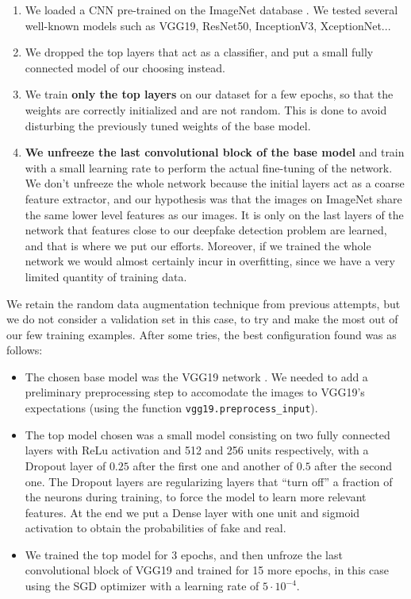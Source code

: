 \documentclass[11pt]{article}
\begin{document}
\begin{enumerate}
  \item We loaded a CNN pre-trained on the ImageNet database \citep{deng2009imagenet}.  We tested several well-known models such as VGG19, ResNet50, InceptionV3, XceptionNet...
  \item We dropped the top layers that act as a classifier, and put a small fully connected model of our choosing instead.
  \item We train \textbf{only the top layers} on our dataset for a few epochs, so that the weights are correctly initialized and are not random. This is done to avoid disturbing the previously tuned weights of the base model.
  \item \textbf{We unfreeze the last convolutional block of the base model} and train with a small learning rate to perform the actual fine-tuning of the network. We don't unfreeze the whole network because the initial layers act as a coarse feature extractor, and our hypothesis was that the images on ImageNet share the same lower level features as our images. It is only on the last layers of the network that features close to our deepfake detection problem are learned, and that is where we put our efforts. Moreover, if we trained the whole network we would almost certainly incur in overfitting, since we have a very limited quantity of training data.
\end{enumerate}

We retain the random data augmentation technique from previous attempts, but we do not consider a validation set in this case, to try and make the most out of our few training examples. After some tries, the best configuration found was as follows:

\begin{itemize}
  \item The chosen base model was the VGG19 network \citep{simonyan2015deep}. We needed to add a preliminary preprocessing step to accomodate the images to VGG19's expectations (using the function \texttt{vgg19.preprocess\_input}).
  \item The top model chosen was a small model consisting on two fully connected layers with ReLu activation and 512 and 256 units respectively, with a Dropout layer of $0.25$ after the first one and another of $0.5$ after the second one. The Dropout layers are regularizing layers that ``turn off'' a fraction of the neurons during training, to force the model to learn more relevant features. At the end we put a Dense layer with one unit and sigmoid activation to obtain the probabilities of fake and real.
  \item We trained the top model for 3 epochs, and then unfroze the last convolutional block of VGG19 and trained for 15 more epochs, in this case using the SGD optimizer with a learning rate of $5\cdot 10^{-4}$.
\end{itemize}
\end{document}
